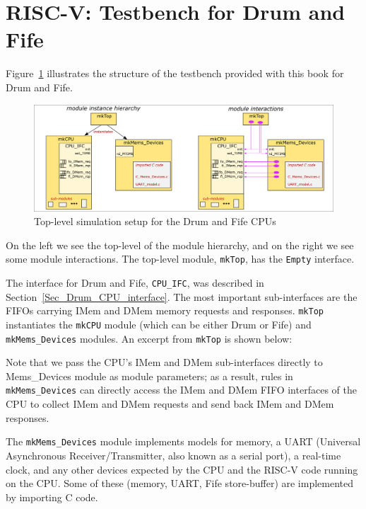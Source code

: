 
\section{RISC-V: Testbench for Drum and Fife}

Figure~\ref{Fig_CPU_Simulation} illustrates the structure of the
testbench provided with this book for Drum and Fife.
\begin{figure}[htbp]
  \centerline{\includegraphics[width=6in,angle=0]{Figures/Fig_CPU_Simulation}}
  \caption{\label{Fig_CPU_Simulation}
           Top-level simulation setup for the Drum and Fife CPUs}
\end{figure}
On the left we see the top-level of the module hierarchy, and on the
right we see some module interactions.  The top-level module,
\verb|mkTop|, has the \verb|Empty| interface.

The interface for Drum and Fife, \verb|CPU_IFC|, was described in
Section~\ref{Sec_Drum_CPU_interface}.  The most important
sub-interfaces are the FIFOs carrying IMem and DMem memory requests
and responses.  \verb|mkTop| instantiates the \verb|mkCPU| module
(which can be either Drum or Fife) and \verb|mkMems_Devices| modules.
An excerpt from \verb|mkTop| is shown below:



Note that we pass the CPU's IMem and DMem sub-interfaces directly to
Mems\_Devices module as module parameters; as a result, rules in
\verb|mkMems_Devices| can directly access the IMem and DMem FIFO
interfaces of the CPU to collect IMem and DMem requests and send back
IMem and DMem responses.

The \verb|mkMems_Devices| module implements models for memory, a UART
(Universal Asynchronous Receiver/Transmitter, also known as a serial
port), a real-time clock, and any other devices expected by the CPU
and the RISC-V code running on the CPU.  Some of these (memory, UART,
Fife store-buffer) are implemented by importing C code.


